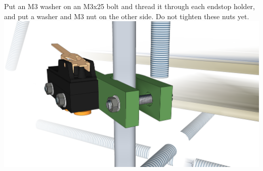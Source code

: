 \documentclass[twoside,a4paper,titlepage]{memoir}
\begin{document}
	\section{}
	Put an M3 washer on an M3x25 bolt and thread it through each endstop holder, and put a washer and
	M3 nut on the other side. Do not tighten these nuts yet.\\
	\includegraphics[width=1\linewidth]{graphics/ch10_5.png}
	
\end{document}
